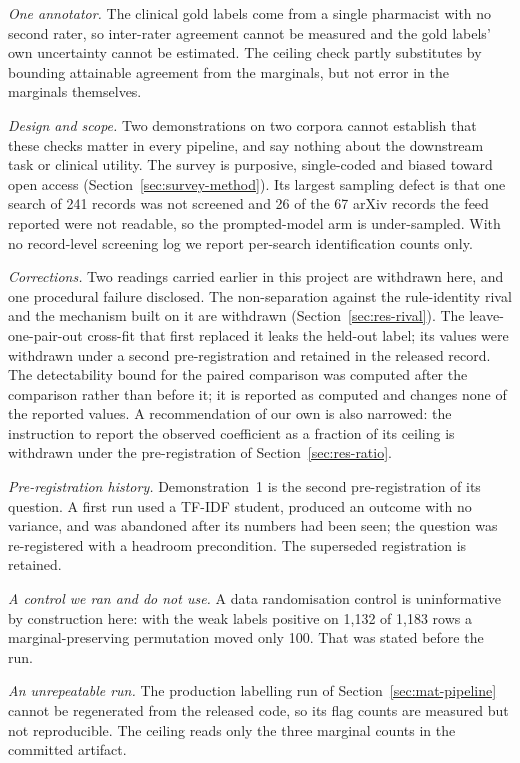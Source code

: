 \documentclass[review]{elsarticle}
\begin{document}
\emph{One annotator.} The clinical gold labels come from a single pharmacist
with no second rater, so inter-rater agreement cannot be measured and the gold
labels' own uncertainty cannot be estimated. The ceiling check partly substitutes
by bounding attainable agreement from the marginals, but not error in the marginals themselves.

\emph{Design and scope.} Two demonstrations on two corpora cannot establish that
these checks matter in every pipeline, and say nothing about the downstream task or clinical utility. The
survey is purposive, single-coded and biased toward open access
(Section~\ref{sec:survey-method}). Its largest sampling defect is that one search
of 241 records was not screened and 26 of the 67 arXiv records the feed reported were not readable, so the prompted-model arm is under-sampled. With no
record-level screening log we report per-search identification counts only.

\emph{Corrections.} Two readings carried earlier in this project are withdrawn here, and one
procedural failure disclosed. The non-separation against the rule-identity rival and the mechanism built on
it are withdrawn (Section~\ref{sec:res-rival}). The leave-one-pair-out cross-fit that first replaced it leaks the held-out
label; its values were withdrawn under a second pre-registration and retained in
the released record. The detectability bound for the paired comparison was computed after the
comparison rather than before it; it is reported as computed and changes none of
the reported values. A recommendation of
our own is also narrowed: the instruction to report the observed coefficient as
a fraction of its ceiling is withdrawn under the pre-registration of
Section~\ref{sec:res-ratio}.

\emph{Pre-registration history.} Demonstration~1 is the second pre-registration
of its question. A first run used a TF-IDF student, produced an outcome with no
variance, and was abandoned after its numbers had been seen; the question was
re-registered with a headroom precondition. The superseded registration is
retained.

\emph{A control we ran and do not use.} A data randomisation control
\cite{adebayo2018sanity} is uninformative by construction here: with the weak
labels positive on 1,132 of 1,183 rows a marginal-preserving permutation moved
only 100. That was stated before the run.

\emph{An unrepeatable run.} The production labelling run of
Section~\ref{sec:mat-pipeline} cannot be regenerated from the released code, so
its flag counts are measured but not reproducible.
The ceiling reads only the three marginal
counts in the committed artifact.
\end{document}
